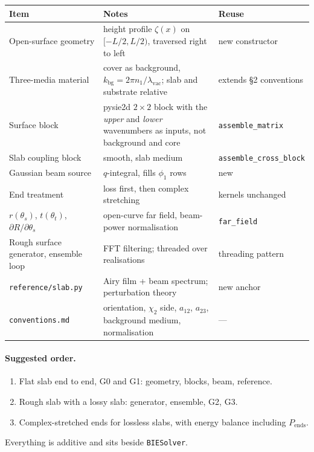 \documentclass[11pt,a4paper]{article}
\begin{document}
\begin{center}
\small
\begin{tabularx}{\textwidth}{>{\raggedright}p{4.3cm}X>{\raggedright\arraybackslash}p{2.6cm}}
\toprule
Item & Notes & Reuse \\
\midrule
Open-surface geometry & height profile $\zeta(x)$ on $[-L/2,L/2)$, traversed right to left & new constructor\\
Three-media material & cover as background, $k_{\text{bg}}=2\pi n_1/\lambda_{\text{vac}}$; slab and substrate relative & extends \S2 conventions\\
Surface block & pysie2d $2\times2$ block with the \emph{upper} and \emph{lower} wavenumbers as inputs, not background and core & \texttt{assemble\_matrix}\\
Slab coupling block & smooth, slab medium & \texttt{assemble\_cross\_block}\\
Gaussian beam source & $q$-integral, fills $\phi_1$ rows & new\\
End treatment & loss first, then complex stretching & kernels unchanged\\
$r(\theta_s)$, $t(\theta_t)$, $\partial R/\partial\theta_s$ & open-curve far field, beam-power normalisation & \texttt{far\_field}\\
Rough surface generator, ensemble loop & FFT filtering; threaded over realisations & threading pattern\\
\texttt{reference/slab.py} & Airy film + beam spectrum; perturbation theory & new anchor\\
\texttt{conventions.md} & orientation, $\chi_2$ side, $a_{12}$, $a_{23}$, background medium, normalisation & ---\\
\bottomrule
\end{tabularx}
\end{center}

\paragraph{Suggested order.}
\begin{enumerate}
  \item Flat slab end to end, G0 and G1: geometry, blocks, beam, reference.
  \item Rough slab with a lossy slab: generator, ensemble, G2, G3.
  \item Complex-stretched ends for lossless slabs, with energy balance including $P_{\text{ends}}$.
\end{enumerate}
Everything is additive and sits beside \texttt{BIESolver}.
\end{document}
